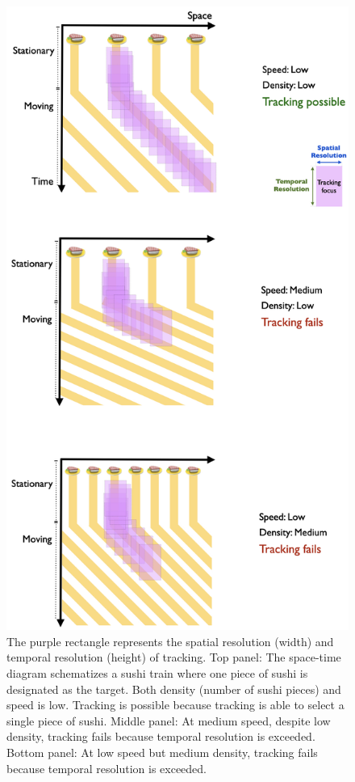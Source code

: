 \documentclass[
]{book}
\begin{document}
\begin{figure}
\includegraphics[width=0.8\linewidth]{imagesForRmd/spatialTempResltnSushi/temporalResltnSushi} \caption{The purple rectangle represents the spatial resolution (width) and temporal resolution (height) of tracking. Top panel: The space-time diagram schematizes a sushi train where one piece of sushi is designated as the target. Both density (number of sushi pieces) and speed is low. Tracking is possible because tracking is able to select a single piece of sushi. Middle panel: At medium speed, despite low density, tracking fails because temporal resolution is exceeded.  Bottom panel: At low speed but medium density, tracking fails because temporal resolution is exceeded.}\label{fig:temporalResltnSushi}
\end{figure}
\end{document}
